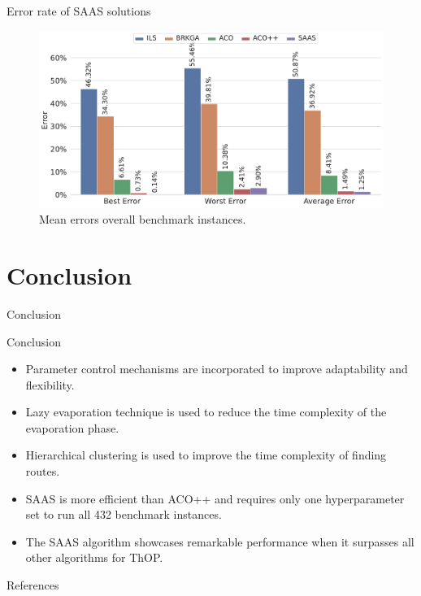 \documentclass[aspectratio=169]{beamer}
\begin{document}
\begin{frame}{Error rate of SAAS solutions}
    \begin{figure}
        \centering
        \includegraphics[width=0.75\linewidth]{img/error_rate.pdf}
        \caption{Mean errors overall benchmark instances.}
        \label{fig:error_rate}
    \end{figure}
\end{frame}
\section{Conclusion}
\begin{frame}{Conclusion}
    \begin{block}{Conclusion}
        \begin{itemize}
            \justifying
            \item Parameter control mechanisms are incorporated to improve adaptability and flexibility.
            \item Lazy evaporation technique is used to reduce the time complexity of the evaporation phase.
            \item Hierarchical clustering is used to improve the time complexity of finding routes.
            \item SAAS is more efficient than ACO++ and requires only one hyperparameter set to run all 432 benchmark instances.
            \item  The SAAS algorithm showcases remarkable performance when it surpasses all other algorithms for ThOP.
        \end{itemize}
        \vspace{0.1cm}
    \end{block}
\end{frame}
\begin{frame}{References}
    \printbibliography
\end{frame}
\end{document}
